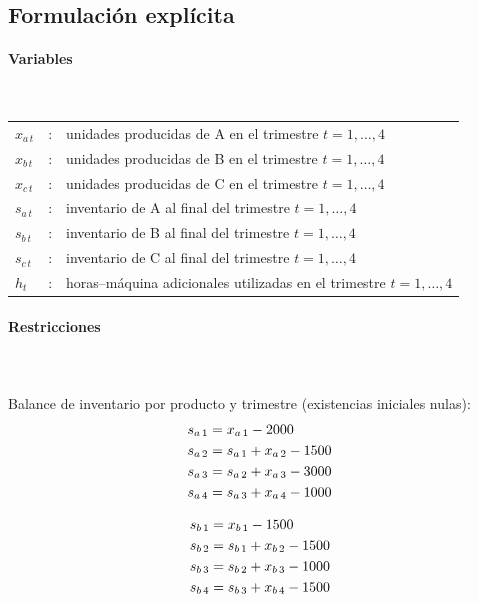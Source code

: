 
\subsection{Formulación explícita}

\paragraph{Variables}\mbox{}\\

\begin{tabular}{l c l}
    $x_{a\,t}$ & : & unidades producidas de A en el trimestre $t=1,\dots,4$\\
    $x_{b\,t}$ & : & unidades producidas de B en el trimestre $t=1,\dots,4$\\
    $x_{c\,t}$ & : & unidades producidas de C en el trimestre $t=1,\dots,4$\\
    $s_{a\,t}$ & : & inventario de A al final del trimestre $t=1,\dots,4$\\
    $s_{b\,t}$ & : & inventario de B al final del trimestre $t=1,\dots,4$\\
    $s_{c\,t}$ & : & inventario de C al final del trimestre $t=1,\dots,4$\\
    $h_t$      & : & horas--máquina adicionales utilizadas en el trimestre $t=1,\dots,4$\\
\end{tabular}

\paragraph{Restricciones}\mbox{}\\
\\
Balance de inventario por producto y trimestre (existencias iniciales nulas):
\begin{align}
s_{a\,1} &= x_{a\,1} - 2000 \notag\\
s_{a\,2} &= s_{a\,1} + x_{a\,2} - 1500 \notag\\
s_{a\,3} &= s_{a\,2} + x_{a\,3} - 3000 \notag\\
s_{a\,4} &= s_{a\,3} + x_{a\,4} - 1000 \notag
\end{align}

\begin{align}
s_{b\,1} &= x_{b\,1} - 1500 \notag\\
s_{b\,2} &= s_{b\,1} + x_{b\,2} - 1500 \notag\\
s_{b\,3} &= s_{b\,2} + x_{b\,3} - 1000 \notag\\
s_{b\,4} &= s_{b\,3} + x_{b\,4} - 1500 \notag
\end{align}

